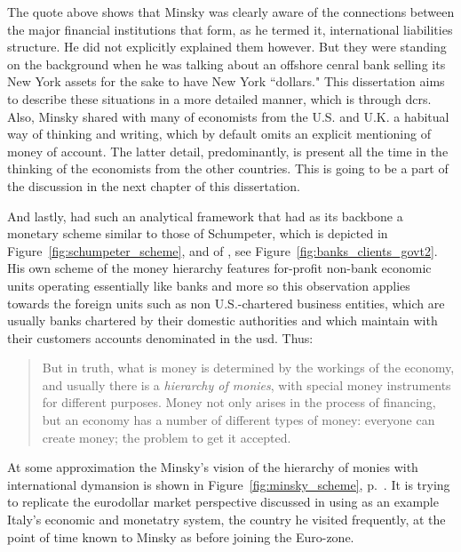 The quote above shows that Minsky was clearly aware of the connections between the major financial institutions that form, as he termed it, international liabilities structure. He did not explicitly explained them however. But they were standing on the background when he was talking about an offshore cenral bank selling its New York assets for the sake to have New York ``dollars." This dissertation aims to describe these situations in a more detailed manner, which is through \acfp{dcr}. Also, Minsky shared with many of economists from the U.S. and U.K. a habitual way of thinking and writing, which by default omits an explicit mentioning of money of account. The latter detail, predominantly, is present all the time in the thinking of the economists from the other countries. This is going to be a part of the discussion in the next chapter of this dissertation.

And lastly, \citeauthor{minsky1986} had such an analytical framework that had as its backbone a monetary scheme similar to those of Schumpeter, which is depicted in Figure~\ref{fig:schumpeter_scheme}, and of \citeauthor{innes1913}, see Figure~\ref{fig:banks_clients_govt2}. His own scheme of the money hierarchy features for-profit non-bank economic units operating essentially like banks and more so this observation applies towards the foreign units such as non U.S.-chartered business entities, which are usually banks chartered by their domestic authorities and which maintain with their customers accounts denominated in the \acf{usd}. Thus:

\begin{quote}
But in truth, what is money is determined by the workings of the economy, and usually there is a \textit{hierarchy of monies}, with special money instruments for different purposes. Money not only arises in the process of financing, but an economy has a number of different types of money: everyone can create money; the problem to get it accepted.~\citep[p.~255, emphasis added]{minsky1986}
\end{quote}

At some approximation the Minsky's vision of the hierarchy of monies with international dymansion is shown in Figure~\ref{fig:minsky_scheme}, p.~\pageref{fig:minsky_scheme}. It is trying to replicate the eurodollar market perspective discussed in \citep{minsky1985_} using as an example Italy's economic and monetatry system, the country he visited frequently, at the point of time known to Minsky as before joining the Euro-zone. 

